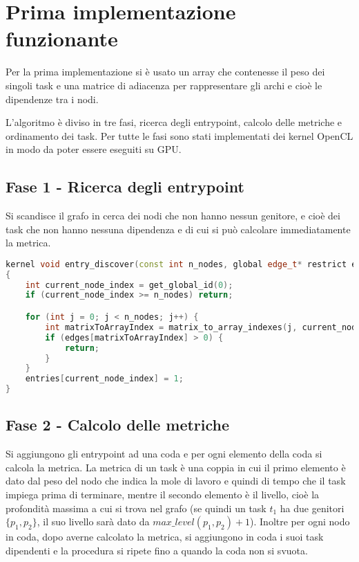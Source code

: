\documentclass[../relazione.tex]{subfiles}
\begin{document}
\section{Prima implementazione funzionante}
Per la prima implementazione si è usato un array che contenesse il peso dei singoli task e una matrice di adiacenza per rappresentare gli archi e cioè le dipendenze tra i nodi. 

L'algoritmo è diviso in tre fasi, ricerca degli entrypoint, 
calcolo delle metriche e ordinamento dei task. Per tutte le fasi sono stati implementati dei kernel OpenCL in modo da poter essere eseguiti su GPU.

\subsection{Fase 1 - Ricerca degli entrypoint}
Si scandisce il grafo in cerca dei nodi che non hanno nessun genitore, e cioè dei task che non hanno nessuna dipendenza e di cui si può calcolare immediatamente la metrica.

\begin{lstlisting}[language=C++, caption={Find entrypoints kernel},captionpos=b]
kernel void entry_discover(const int n_nodes, global edge_t* restrict edges, volatile global int* n_entries, global int* entries)
{
	int current_node_index = get_global_id(0);
	if (current_node_index >= n_nodes) return;

	for (int j = 0; j < n_nodes; j++) {
		int matrixToArrayIndex = matrix_to_array_indexes(j, current_node_index, n_nodes);
		if (edges[matrixToArrayIndex] > 0) {
			return;
		}
	}
	entries[current_node_index] = 1;
}
\end{lstlisting}

\subsection{Fase 2 - Calcolo delle metriche}
Si aggiungono gli entrypoint ad una coda e per ogni elemento della coda si calcola la metrica. 
La metrica di un task è una coppia in cui il primo elemento è dato dal peso del nodo che indica la mole di lavoro e quindi di tempo che il task impiega prima di terminare, mentre il secondo elemento è il livello, cioè la profondità massima a cui si trova nel grafo (se quindi un task $t_1$ ha due genitori $\{p_1, p_2\}$, il suo livello sarà dato da $max\_level(p_1, p_2) + 1$).
Inoltre per ogni nodo in coda, dopo averne calcolato la metrica, si aggiungono in coda i suoi task dipendenti e la procedura si ripete fino a quando la coda non si svuota.
\end{document}
